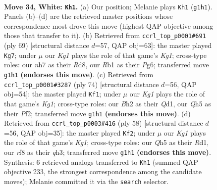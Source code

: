 \documentclass[11pt]{article}
\begin{document}
\clearpage

\begin{figure}[p]\centering
\begin{subfigure}{0.46\textwidth}\centering
\resizebox{\linewidth}{!}{%
\newchessgame
\chessboard[
  setfen={5rk1/7n/1pq5/p1p2p1Q/2P5/1P3R2/P2r3B/1R4K1 w - - 0 34},
  showmover=false,
  pgfstyle=straightmove, color=movearrow, markmove={g1-h1}
]}
\caption{}
\end{subfigure}\hfill
\begin{subfigure}{0.46\textwidth}\centering
\resizebox{\linewidth}{!}{%
\newchessgame
\chessboard[
  setfen={1r1r2k1/5p2/4p1pp/Q3P3/2qb3P/R5P1/3R1PBK/8 b - - 1 35},
  showmover=false,
  pgfstyle=straightmove, color=movearrow, markmove={g8-g7}
]}
\caption{}
\end{subfigure}
\\[4pt]
\begin{subfigure}{0.46\textwidth}\centering
\resizebox{\linewidth}{!}{%
\newchessgame
\chessboard[
  setfen={6k1/5p2/2p3p1/2Ppq3/1P2r3/P5RP/5P2/3Q2K1 w - - 4 38},
  showmover=false,
  pgfstyle=straightmove, color=movearrow, markmove={g1-f1}
]}
\caption{}
\end{subfigure}\hfill
\begin{subfigure}{0.46\textwidth}\centering
\resizebox{\linewidth}{!}{%
\newchessgame
\chessboard[
  setfen={2r3k1/1p3pp1/7p/pP1Q4/P4P2/7q/8/2BR2K1 w - - 2 30},
  showmover=false,
  pgfstyle=straightmove, color=movearrow, markmove={g1-f2}
]}
\caption{}
\end{subfigure}
\caption{\textbf{Move 34, White: \texttt{Kh1}.} (a) Our position; Melanie plays \texttt{Kh1} (\texttt{g1h1}). Panels (b)--(d) are the retrieved master positions whose correspondence most drove this move (highest QAP objective among those that transfer to it). (b) Retrieved from \texttt{ccrl\_top\_p0001\#691} (ply 69) [structural distance $d$=57, QAP obj=63]: the master played \texttt{Kg7}; under $\mu$ our \emph{Kg1} plays the role of that game's \emph{Kg1}; cross-type roles: our \emph{n}h7 as their \emph{R}d8, our \emph{R}b1 as their \emph{P}g6; transferred move \texttt{g1h1} \textbf{(endorses this move)}. (c) Retrieved from \texttt{ccrl\_top\_p0001\#3287} (ply 74) [structural distance $d$=56, QAP obj=54]: the master played \texttt{Kf1}; under $\mu$ our \emph{Kg1} plays the role of that game's \emph{Kg1}; cross-type roles: our \emph{B}h2 as their \emph{Q}d1, our \emph{Q}h5 as their \emph{P}f2; transferred move \texttt{g1h1} \textbf{(endorses this move)}. (d) Retrieved from \texttt{ccrl\_top\_p0003\#416} (ply 58) [structural distance $d$=56, QAP obj=35]: the master played \texttt{Kf2}; under $\mu$ our \emph{Kg1} plays the role of that game's \emph{Kg1}; cross-type roles: our \emph{Q}h5 as their \emph{R}d1, our \emph{r}f8 as their \emph{q}h3; transferred move \texttt{g1h1} \textbf{(endorses this move)}. Synthesis: 6 retrieved analogs transferred to \texttt{Kh1} (summed QAP objective 233, the strongest correspondence among the candidate moves); Melanie committed it via the \texttt{search} selector.}
\label{fig:thought-m66}
\end{figure}
\end{document}
